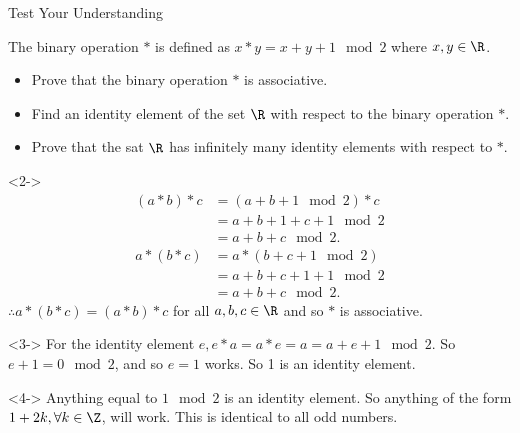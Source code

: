\documentclass[8pt]{beamer}
\begin{document}
\begin{frame}[shrink=15]{Test Your Understanding}
	\begin{problem}
		The binary operation $*$ is defined as  $x*y=x+y+1 \mod 2$ where  $x,y\in \R$.
		\begin{itemize}
			\item Prove that the binary operation $*$ is associative.
			\item Find an identity element of the set $ \R$ with respect to the binary operation $*$.
			\item Prove that the sat $ \R$ has infinitely many identity elements with respect to $*$.
		\end{itemize}
	\end{problem}

\begin{solution}<2->
	\begin{align*}
		(a*b)*c &= (a+b+1 \mod 2) * c \\
		&= a+b+1+c+1 \mod 2 \\
		&= a + b +c \mod 2 
	.\end{align*}
	\begin{align*}
		a*(b*c) &= a*(b+c+1 \mod 2) \\
		&= a+b+c+1+1 \mod 2 \\
		&= a+b+c \mod 2 
	.\end{align*}
	$\therefore a*(b*c)=(a*b)*c$ for all  $a,b,c \in \R$ and so $*$ is associative.
\end{solution}
\begin{solution}<3->
	For the identity element $e, e*a=a*e=a=a+e+1 \mod 2$.
	So $e+1=0 \mod 2$, and so  $e=1$ works.
	So 1 is an identity element.
\end{solution}
\begin{solution}<4->
	Anything equal to $1 \mod 2$ is an identity element. So anything of the form  $1+2k, \forall k \in \Z$, will work. This is identical to all odd numbers.
\end{solution}

\end{frame}
\end{document}
